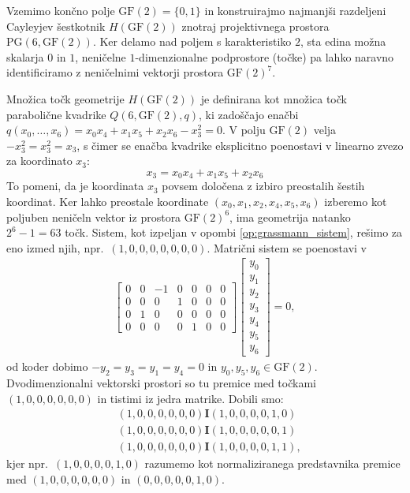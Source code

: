\documentclass[fin1, tisk]{fmfdelo}
\newcommand{\II}{\mathbf{I}}
\newcommand{\PG}{\mathrm{PG}}
\newcommand{\GF}{\mathrm{GF}}
\begin{document}
\begin{zgled}\label{zgled:cayley_sestkotnik_gf2}
    Vzemimo končno polje $\GF(2) = \{0,1\}$ in konstruirajmo najmanjši razdeljeni Cayleyjev 
    šestkotnik $H(\GF(2))$ znotraj projektivnega prostora $\PG(6, \GF(2))$. Ker delamo nad 
    poljem s karakteristiko $2$, sta edina možna skalarja $0$ in $1$, neničelne 
    $1$-dimenzionalne podprostore (točke) pa lahko naravno identificiramo z neničelnimi 
    vektorji prostora $\GF(2)^7$.

    Množica točk geometrije $H(\GF(2))$ je definirana kot množica točk parabolične kvadrike 
    $Q(6, \GF(2), q)$, ki zadoščajo enačbi $q(x_0, \ldots, x_6) = x_0x_4 + x_1x_5 + x_2x_6 - x_3^2 = 0$. 
    V polju $\GF(2)$ velja $-x_3^2 = x_3^2 = x_3$, s čimer se enačba kvadrike eksplicitno 
    poenostavi v linearno zvezo za koordinato $x_3$:
    \[ x_3 = x_0x_4 + x_1x_5 + x_2x_6 \]
    To pomeni, da je koordinata $x_3$ povsem določena z izbiro preostalih šestih koordinat. 
    Ker lahko preostale koordinate $(x_0, x_1, x_2, x_4, x_5, x_6)$ izberemo kot poljuben 
    neničeln vektor iz prostora $\GF(2)^6$, ima geometrija natanko $2^6 - 1 = 63$ točk. 
    Sistem, kot izpeljan v opombi \ref{op:grassmann_sistem}, rešimo za eno izmed njih, npr.~$(1,0,0,0,0,0,0,0)$.
    Matrični sistem se poenostavi v
    \begin{align*}
        \begin{bmatrix}
            0&0&-1&0&0&0&0\\
            0&0&0&1&0&0&0\\
            0&1&0&0&0&0&0\\
            0&0&0&0&1&0&0
        \end{bmatrix}
        \begin{bmatrix}
            y_0 \\ y_1 \\ y_2 \\ y_3 \\ y_4 \\ y_5 \\ y_6
        \end{bmatrix} = 0,
    \end{align*}
    od koder dobimo $-y_2 = y_3 = y_1 = y_4 = 0$ in $y_0, y_5, y_6\in\GF(2)$.
    Dvodimenzionalni vektorski prostori so tu premice med točkami $(1,0,0,0,0,0,0)$ in tistimi iz jedra matrike.
    Dobili smo:
    \begin{align*}
        &(1,0,0,0,0,0,0)\II (1,0,0,0,0,1,0) \\ 
        &(1,0,0,0,0,0,0)\II (1,0,0,0,0,0,1) \\
        &(1,0,0,0,0,0,0)\II (1,0,0,0,0,1,1),
    \end{align*}
    kjer npr.~$(1,0,0,0,0,1,0)$ razumemo kot normaliziranega predstavnika premice med $(1,0,0,0,0,0,0)$ in $(0,0,0,0,0,1,0)$.


\end{zgled}
\end{document}
